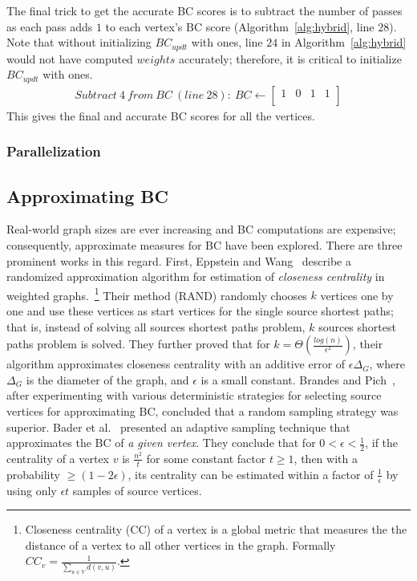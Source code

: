 %
The final trick to get the accurate BC scores is to subtract the number of
passes as each pass adds $1$ to each vertex's BC score
(Algorithm~\ref{alg:hybrid}, line $28$).
%
Note that without initializing $BC_{updt}$ with ones, line $24$ in
Algorithm~\ref{alg:hybrid} would not have computed $weights$ accurately;
therefore, it is critical to initialize $BC_{updt}$ with ones.
%
\begin{align*}
Subtract\ 4\ from\ BC\ (line\ 28):\ 
BC\leftarrow{}\left[\begin{array}{cccc}1 & 0 & 1 & 1 \\\end{array} \right]
\end{align*}
%
This gives the final and accurate BC scores for all the vertices.
%

%
%
\subsubsection{Parallelization}
%

%
%
\subsection{Approximating BC}
\label{subsec:approximate_bc}
%
Real-world graph sizes are ever increasing and BC computations are expensive;
consequently, approximate measures for BC have been explored.
%
There are three prominent works in this regard.
%
First, Eppstein and Wang~\cite{Eppstein-2004} describe a randomized
approximation algorithm for estimation of \textit{closeness centrality} in
weighted graphs.~\footnote{Closeness centrality (CC) of a vertex is a global
metric that measures the the distance of a vertex to all other vertices in the
graph.
%
Formally $CC_v=\frac{1}{\sum_{u\in{}V}{d(v,u)}}$.}
%
Their method (RAND) randomly chooses $k$ vertices one by one and use these 
vertices as start vertices for the single source shortest paths; that is, 
instead of solving all sources shortest paths problem, $k$ sources shortest
paths problem is solved.
%
They further proved that for $k=\Theta{(\frac{log(n)}{\epsilon{}^2})}$, their
algorithm approximates closeness centrality with an additive error of
$\epsilon{}\Delta{}_{G}$, where $\Delta{}_G$ is the diameter of the graph, and
$\epsilon{}$ is a small constant.
%
Brandes and Pich~\cite{brandes-2007}, after experimenting with various 
deterministic strategies for selecting source vertices for approximating BC,
concluded that a random sampling strategy was superior.
%
Bader et al.~\cite{Bader07:ApproxBC} presented an adaptive sampling technique
that approximates the BC of \textit{a given vertex}.
%
They conclude that for $0<\epsilon{}<\frac{1}{2}$, if the centrality of a vertex
$v$ is $\frac{n^2}{t}$ for some constant factor $t\ge{}1$, then with a 
probability $\ge{}(1-2\epsilon{})$, its centrality can be estimated within a 
factor of $\frac{1}{\epsilon{}}$ by using only $\epsilon{}t$ samples of 
source vertices.
%
